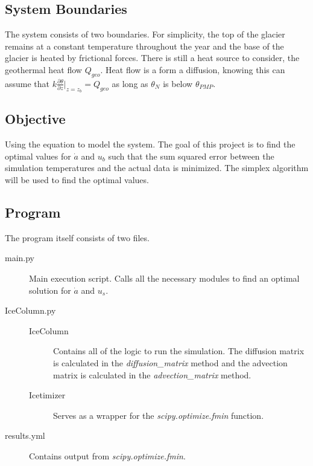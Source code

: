 \documentclass{article}%
\begin{document}
    \subsection{System Boundaries}
    The system consists of two boundaries. 
    For simplicity, the top of the glacier remains at a constant temperature throughout the year and the base of the glacier is heated by frictional forces. 
    There is still a heat source to consider, the geothermal heat flow $Q_{geo}$. 
    Heat flow is a form a diffusion, knowing this can assume that $k \frac{\partial \theta}{\partial z} |_{z=z_b}= Q_{geo}$ as long as $\theta_N$ is below $\theta_{PMP}$.

    \subsection{Objective}
    Using the equation to model the system. 
    The goal of this project is to find the optimal values for $\dot{a}$ and $u_b$ such that the sum squared error between the simulation temperatures and the actual data is minimized. 
    The simplex algorithm will be used to find the optimal values.  

    \subsection{Program}
    The program itself consists of two files.
    \begin{description}
        \item[main.py] Main execution script. 
        Calls all the necessary modules to find an optimal solution for $\dot{a}$ and $u_s$.
        \item[IceColumn.py] 
        \begin{description}
            \item[IceColumn] Contains all of the logic to run the simulation. 
            The diffusion matrix is calculated in the {\it diffusion\_matrix } method and the advection matrix is calculated in the {\it advection\_matrix} method. 
            \item[Icetimizer] Serves as a wrapper for the {\it scipy.optimize.fmin } function. 
        \end{description}
        \item[results.yml] Contains output from {\it scipy.optimize.fmin}. 
    \end{description}

\end{document}
